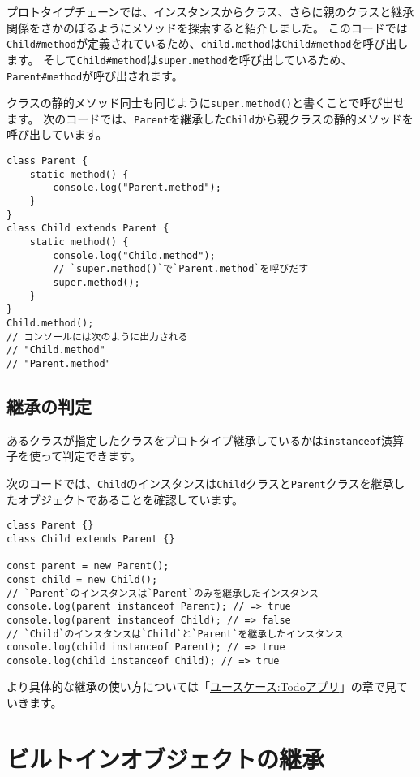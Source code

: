 プロトタイプチェーンでは、インスタンスからクラス、さらに親のクラスと継承関係をさかのぼるようにメソッドを探索すると紹介しました。
このコードでは\texttt{Child\#method}が定義されているため、\texttt{child.method}は\texttt{Child\#method}を呼び出します。
そして\texttt{Child\#method}は\texttt{super.method}を呼び出しているため、\texttt{Parent\#method}が呼び出されます。

クラスの静的メソッド同士も同じように\texttt{super.method()}と書くことで呼び出せます。
次のコードでは、\texttt{Parent}を継承した\texttt{Child}から親クラスの静的メソッドを呼び出しています。

\begin{lstlisting}
class Parent {
    static method() {
        console.log("Parent.method");
    }
}
class Child extends Parent {
    static method() {
        console.log("Child.method");
        // `super.method()`で`Parent.method`を呼びだす
        super.method();
    }
}
Child.method(); 
// コンソールには次のように出力される
// "Child.method"
// "Parent.method"
\end{lstlisting}

\hypertarget{instanceof}{%
\subsection{継承の判定}\label{instanceof}}

あるクラスが指定したクラスをプロトタイプ継承しているかは\texttt{instanceof}演算子を使って判定できます。

次のコードでは、\texttt{Child}のインスタンスは\texttt{Child}クラスと\texttt{Parent}クラスを継承したオブジェクトであることを確認しています。

\begin{lstlisting}
class Parent {}
class Child extends Parent {}

const parent = new Parent();
const child = new Child();
// `Parent`のインスタンスは`Parent`のみを継承したインスタンス
console.log(parent instanceof Parent); // => true
console.log(parent instanceof Child); // => false
// `Child`のインスタンスは`Child`と`Parent`を継承したインスタンス
console.log(child instanceof Parent); // => true
console.log(child instanceof Child); // => true
\end{lstlisting}

より具体的な継承の使い方については「\href{../../use-case/todoapp/README.md}{ユースケース:Todoアプリ}」の章で見ていきます。

\hypertarget{extends-built-in}{%
\section{ビルトインオブジェクトの継承}\label{extends-built-in}}


